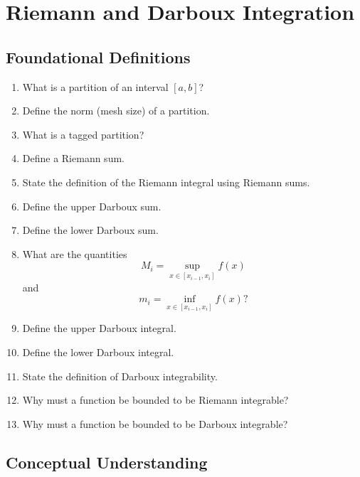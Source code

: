 \section{Riemann and Darboux Integration}

\subsection{Foundational Definitions}

\begin{enumerate}
  \item What is a partition of an interval $[a,b]$?
  \item Define the norm (mesh size) of a partition.
  \item What is a tagged partition?
  \item Define a Riemann sum.
  \item State the definition of the Riemann integral using Riemann sums.
  \item Define the upper Darboux sum.
  \item Define the lower Darboux sum.
  \item What are the quantities
    \[
      M_i = \sup_{x \in [x_{i-1},x_i]} f(x)
    \]
    and
    \[
      m_i = \inf_{x \in [x_{i-1},x_i]} f(x)?
    \]
  \item Define the upper Darboux integral.
  \item Define the lower Darboux integral.
  \item State the definition of Darboux integrability.
  \item Why must a function be bounded to be Riemann integrable?
  \item Why must a function be bounded to be Darboux integrable?
\end{enumerate}

\subsection{Conceptual Understanding}

